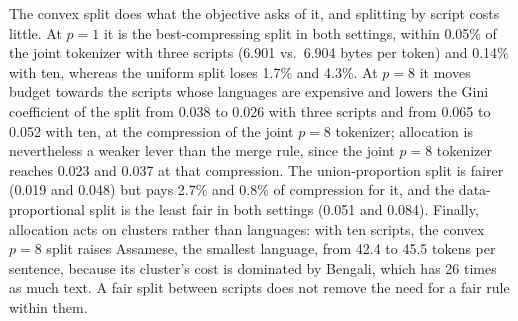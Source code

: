 The convex split does what the objective asks of it, and splitting by script costs little.
At $p=1$ it is the best-compressing split in both settings, within 0.05\% of the joint
tokenizer with three scripts (6.901 vs.\ 6.904 bytes per token) and 0.14\% with ten,
whereas the uniform split loses 1.7\% and 4.3\%. At $p=8$ it moves budget towards the scripts
whose languages are expensive and lowers the Gini coefficient of the split from 0.038 to
0.026 with three scripts and from 0.065 to 0.052 with ten, at the compression of the joint
$p=8$ tokenizer; allocation is nevertheless a weaker lever than the merge rule, since the
joint $p=8$ tokenizer reaches 0.023 and 0.037 at that compression.
The union-proportion split is fairer (0.019 and 0.048) but pays 2.7\% and 0.8\% of
compression for it, and the data-proportional split is the least fair in both settings
(0.051 and 0.084). Finally, allocation acts on clusters rather than languages: with ten scripts, the
convex $p=8$ split raises Assamese, the smallest language, from 42.4 to 45.5 tokens per
sentence, because its cluster's cost is dominated by Bengali, which has 26 times as much
text. A fair split between scripts does not remove the need for a fair rule within them.

\begin{table}[t]
\centering
\small
{}
\caption{Vocabulary allocation across scripts at 32k (three scripts, main setting) and 64k
(ten scripts, 14 languages at natural balance); training-text compression, single runs.}
\label{tab:alloc}
\end{table}

